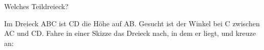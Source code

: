 \setcounter{aufgabe}{15}

\begin{aufgabe}{Welches Teildreieck?}
\begin{teile}
\teil Im Dreieck ABC ist CD die Höhe auf AB. Gesucht ist der Winkel bei C zwischen AC und CD. Fahre in einer Skizze das Dreieck nach, in dem er liegt, und kreuze an: \\  \\  \\ 
\end{teile}
\end{aufgabe}

